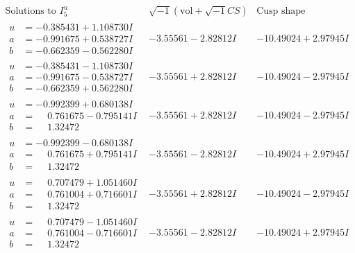 \documentclass[1p]{elsarticle_modified}
\theoremstyle{definition}
\newcommand{\I}{\sqrt{-1}}
\begin{document}
$$\begin{array}{c|c|c}  
\text{Solutions to }I^u_{5}& \I (\text{vol} + \sqrt{-1}CS) & \text{Cusp shape}\\
 \hline 
\begin{aligned}
u &= -0.385431 + 1.108730 I \\
a &= -0.991675 + 0.538727 I \\
b &= -0.662359 - 0.562280 I\end{aligned}
 & -3.55561 - 2.82812 I & -10.49024 + 2.97945 I \\ \hline\begin{aligned}
u &= -0.385431 - 1.108730 I \\
a &= -0.991675 - 0.538727 I \\
b &= -0.662359 + 0.562280 I\end{aligned}
 & -3.55561 + 2.82812 I & -10.49024 - 2.97945 I \\ \hline\begin{aligned}
u &= -0.992399 + 0.680138 I \\
a &= \phantom{-}0.761675 - 0.795141 I \\
b &= \phantom{-}1.32472\phantom{ +0.000000I}\end{aligned}
 & -3.55561 + 2.82812 I & -10.49024 - 2.97945 I \\ \hline\begin{aligned}
u &= -0.992399 - 0.680138 I \\
a &= \phantom{-}0.761675 + 0.795141 I \\
b &= \phantom{-}1.32472\phantom{ +0.000000I}\end{aligned}
 & -3.55561 - 2.82812 I & -10.49024 + 2.97945 I \\ \hline\begin{aligned}
u &= \phantom{-}0.707479 + 1.051460 I \\
a &= \phantom{-}0.761004 + 0.716601 I \\
b &= \phantom{-}1.32472\phantom{ +0.000000I}\end{aligned}
 & -3.55561 + 2.82812 I & -10.49024 - 2.97945 I \\ \hline\begin{aligned}
u &= \phantom{-}0.707479 - 1.051460 I \\
a &= \phantom{-}0.761004 - 0.716601 I \\
b &= \phantom{-}1.32472\phantom{ +0.000000I}\end{aligned}
 & -3.55561 - 2.82812 I & -10.49024 + 2.97945 I \\ \hline\begin{aligned}

\end{aligned}
\end{array}$$
\end{document}
